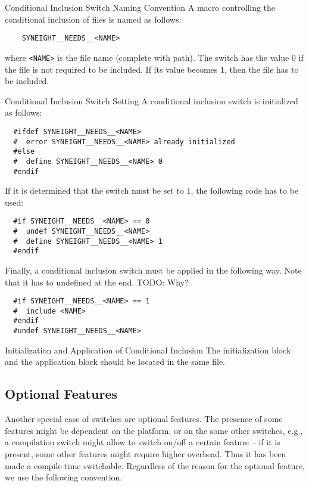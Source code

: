 \begin{rule*}{Conditional Inclusion Switch Naming Convention}
  A macro controlling the conditional inclusion of files is named as
  follows: 
  \begin{verbatim}
    SYNEIGHT__NEEDS__<NAME>
  \end{verbatim}
  where {\tt <NAME>} is the file name (complete with path). The switch
  has the value 0 if the file is not required to be included. If its
  value becomes 1, then the file has to be included. 
\end{rule*}
%
\begin{rule*}{Conditional Inclusion Switch Setting}
  A conditional inclusion switch is initialized as follows:
\begin{verbatim}
  #ifdef SYNEIGHT__NEEDS__<NAME> 
  #  error SYNEIGHT__NEEDS__<NAME> already initialized
  #else
  #  define SYNEIGHT__NEEDS__<NAME> 0
  #endif
\end{verbatim}
  If it is determined that the switch must be set to 1, the following
  code has to be used:
\begin{verbatim}
  #if SYNEIGHT__NEEDS__<NAME> == 0
  #  undef SYNEIGHT__NEEDS__<NAME>
  #  define SYNEIGHT__NEEDS__<NAME> 1
  #endif
\end{verbatim}
  Finally, a conditional inclusion switch must be applied in the
  following way. Note that it has to undefined at the end.
  TODO: Why?
\begin{verbatim}
  #if SYNEIGHT__NEEDS__<NAME> == 1
  #  include <NAME> 
  #endif
  #undef SYNEIGHT__NEEDS__<NAME>
\end{verbatim}
\end{rule*}

\begin{guideline*}{Initialization and Application of Conditional Inclusion}
  The initialization block and the application block should be located
  in the same file.
\end{guideline*}

\subsection{Optional Features}
\label{sec:optional-features}

Another special case of switches are optional features. The presence
of some features might be dependent on the platform, or on the some
other switches, e.g., a compilation switch might allow to switch
on/off a certain feature -- if it is present, some other features
might require higher overhead. Thus it has been made a compile-time
switchable.  
%
Regardless of the reason for the optional feature, we use the
following convention.


